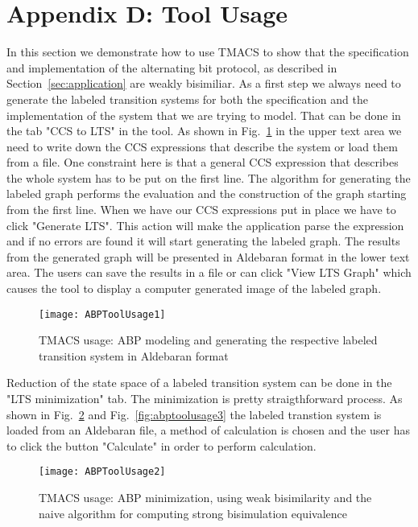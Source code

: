 \section*{Appendix D: Tool Usage}
\label{appendixD}

In this section we demonstrate how to use TMACS to show that the specification and 
implementation of the alternating bit protocol, as described in Section~\ref{sec:application} are weakly bisimiliar. 
As a first step we always need to generate the labeled transition systems for both the specification and the 
implementation of the system that we are trying to model. That can be done in the tab "CCS to LTS" in the tool. 
As shown in Fig.~\ref{fig:abptoolusage1} in the upper text area we need to write down the CCS 
expressions that describe the system or load them from a file. One constraint here
is that a general CCS expression that describes the whole system has to be put on
the first line. The algorithm for generating the labeled graph performs the evaluation and the 
construction of the graph starting from the first line. When we have our CCS expressions
put in place we have to click "Generate LTS". This action will make the application
parse the expression and if no errors are found it will start generating the labeled graph.
The results from the generated graph will be presented in Aldebaran format in the lower text area. 
The users can save the results in a file or can click "View LTS Graph" 
which causes the tool to display a computer generated image of the labeled graph.

\begin{figure}[!ht]
\centering
\texttt{[image: ABPToolUsage1]}
\caption{TMACS usage: ABP modeling and generating the respective labeled transition system in Aldebaran format}
\label{fig:abptoolusage1}
\end{figure}

Reduction of the state space of a labeled transition system can be done in the "LTS minimization" tab. The minimization is pretty 
straigthforward process. As shown in Fig.~\ref{fig:abptoolusage2} and Fig.~\ref{fig:abptoolusage3}
the labeled transtion system is loaded from an Aldebaran file, a method of calculation is chosen and the user has to click the button "Calculate" in order to perform calculation.

\begin{figure}[!ht]
\centering
\texttt{[image: ABPToolUsage2]}
\caption{TMACS usage: ABP minimization, using weak bisimilarity and the naive algorithm for computing strong bisimulation equivalence}
\label{fig:abptoolusage2}
\end{figure}

